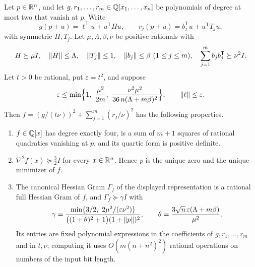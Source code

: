 \begin{lemma}
\label{lem:quartic-realization}
Let $p\in\mathbb R^n$, and let $g,r_1,\ldots,r_m\in\mathbb Q[x_1,\ldots,x_n]$ be
polynomials of degree at most two that vanish at $p$. Write
\[
 g(p+u)=\ell^{\mathsf T}u+u^{\mathsf T}Hu,\qquad
 r_j(p+u)=b_j^{\mathsf T}u+u^{\mathsf T}T_ju,
\]
with symmetric $H,T_j$. Let $\mu,\Lambda,\beta,\nu$ be positive rationals with
\begin{equation}
 H\succeq\mu I,\quad \left\lVert H\right\rVert\le\Lambda,\quad \left\lVert T_j\right\rVert\le1,\quad
 \left\lVert b_j\right\rVert\le\beta\ (1\le j\le m),\quad
 \sum_{j=1}^mb_jb_j^{\mathsf T}\succeq\nu^2I .
 \label{eq:algebraic-realization-data}
\end{equation}
Let $t>0$ be rational, put $\varepsilon=t^2$, and suppose
\begin{equation}
 \varepsilon\le\min\Bigl\{1,\ \frac{\mu^2}{2m},\
   \frac{\nu^2\mu^2}{36\,n(\Lambda+m\beta)^2}\Bigr\},
 \qquad \norm\ell\le\varepsilon .
 \label{eq:algebraic-realization-eps}
\end{equation}
Then $f=(g/(t\nu))^2+\sum_{j=1}^m(r_j/\nu)^2$ has the following properties.
\begin{enumerate}[label=(\alph*)]
\item $f\in\mathbb Q[x]$ has degree exactly four, is a sum of $m+1$ squares of
  rational quadratics vanishing at $p$, and its quartic form is positive
  definite.
\item $\nabla^2f(x)\succeq\tfrac32I$ for every $x\in\mathbb R^n$. Hence $p$ is the
  unique zero and the unique minimizer of $f$.
\item The canonical Hessian Gram $\Gamma_f$ of the displayed representation is
  a rational full Hessian Gram of $f$, and $\Gamma_f\succeq\gamma I$ with
  \[
   \gamma=\frac{\min\{3/2,\ 2\mu^2/(\varepsilon\nu^2)\}}
          {\bigl((1+\theta)^2+1\bigr)(1+\norm p)^2},\qquad
   \theta=\frac{3\sqrt n\,\varepsilon(\Lambda+m\beta)}{\mu^2}.
  \]
  Its entries are fixed polynomial expressions in the coefficients of
  $g,r_1,\ldots,r_m$ and in $t,\nu$; computing it uses
  $O(m(n+n^2)^2)$ rational operations on numbers of the input bit length.
\end{enumerate}
\end{lemma}

